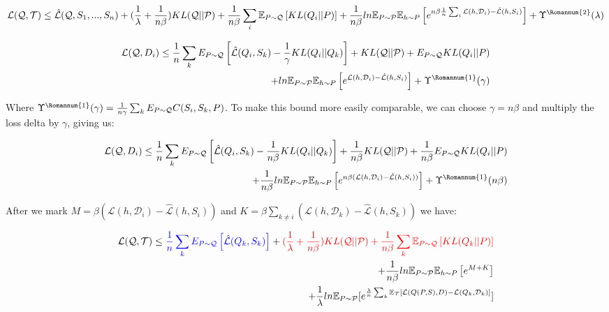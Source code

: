 \documentclass[letterpaper]{article}
\theoremstyle{definition}
\begin{document}
$$\mathcal{L}(\mathcal{Q}, \mathcal{T}) \leq \hat{\mathcal{L}}(\mathcal{Q}, S_1,...,S_n) + (\frac{1}{\lambda}+\frac{1}{n\beta}) KL(\mathcal{Q}||\mathcal{P}) + \frac{1}{n\beta}\sum_i \mathbb{E}_{P\sim \mathcal{Q}} \left [KL(Q_i||P) \right ] + \frac{1}{n\beta}ln\mathbb{E}_{P\sim \mathcal{P}}\mathbb{E}_{h\sim P}\left [ e^{n\beta\frac{1}{n}\sum_i\mathcal{L}(h,\mathcal{D}_i)- \hat{\mathcal{L}}(h, S_i)} \right ] +\Upsilon^{\text{\Romannum{2}}}(\lambda)$$

\begin{equation*}
\begin{split}
\mathcal{L}(\mathcal{Q}, D_i)\leq \frac{1}{n}\sum_k E_{P\sim \mathcal{Q}} \left [ \hat{\mathcal{L}}(Q_i,S_k) -\frac{1}{\gamma}KL(Q_i||Q_k) \right ] +  KL(\mathcal{Q}||\mathcal{P}) + E_{P\sim \mathcal{Q}}KL(Q_i||P) \\  + ln\mathbb{E}_{P\sim \mathcal{P}}\mathbb{E}_{h\sim P}\left [ e^{\mathcal{L}(h,\mathcal{D}_i)- \hat{\mathcal{L}}(h, S_i)} \right ]
 + \Upsilon^{\text{\Romannum{1}}}(\gamma)
\end{split}
\end{equation*}

Where $\Upsilon^{\text{\Romannum{1}}}(\gamma)=\frac{1}{n\gamma}\sum_k E_{P\sim \mathcal{Q}} C(S_i,S_k,P) $. To make this bound more easily comparable, we can choose $\gamma=n\beta$ and multiply the loss delta by $\gamma$, giving us:


\begin{equation*}
\begin{split}
\mathcal{L}(\mathcal{Q}, D_i)\leq \frac{1}{n}\sum_k E_{P\sim \mathcal{Q}} \left [ \hat{\mathcal{L}}(Q_i,S_k) -\frac{1}{n\beta}KL(Q_i||Q_k) \right ] + \frac{1}{n\beta} KL(\mathcal{Q}||\mathcal{P}) +\frac{1}{n\beta} E_{P\sim \mathcal{Q}}KL(Q_i||P) \\  + \frac{1}{n\beta} ln\mathbb{E}_{P\sim \mathcal{P}}\mathbb{E}_{h\sim P}\left [ e^{n\beta(\mathcal{L}(h,\mathcal{D}_i)- \hat{\mathcal{L}}(h, S_i))} \right ]
+ \Upsilon^{\text{\Romannum{1}}}(n\beta)
\end{split}
\end{equation*}

After we mark $M=\beta(\mathcal{L}(h,\mathcal{D}_i)- \hat{\mathcal{L}}(h, S_i))$ and $K=\beta\sum_{k\neq i}(\mathcal{L}(h,\mathcal{D}_k)- \hat{\mathcal{L}}(h, S_k))$ we have:

\begin{equation*}
\begin{split}
\mathcal{L}(\mathcal{Q}, \mathcal{T}) \leq \textcolor{blue}{\frac{1}{n}\sum_k E_{P\sim \mathcal{Q}} \left [ \hat{\mathcal{L}}(Q_k,S_k) \right ]} + \textcolor{red}{(\frac{1}{\lambda}+ \frac{1}{n\beta}) KL(\mathcal{Q}||\mathcal{P}) + \frac{1}{n\beta}\sum_k \mathbb{E}_{P\sim \mathcal{Q}} \left [KL(Q_k||P) \right ]}\\ 
+ \frac{1}{n\beta} ln\mathbb{E}_{P\sim \mathcal{P}}\mathbb{E}_{h\sim P}\left [ e^{M+K} \right ]
 \\+\frac{1}{\lambda}ln \mathbb{E}_{P\sim \mathcal{P}} [e^{\frac{\lambda}{n}\sum_{k}\mathbb{E}_{\mathcal{T}}[\mathcal{L}(Q(P,S),D)- \mathcal{L}(Q_k, \mathcal{D}_k)]}]
\end{split}
\end{equation*}
\end{document}

